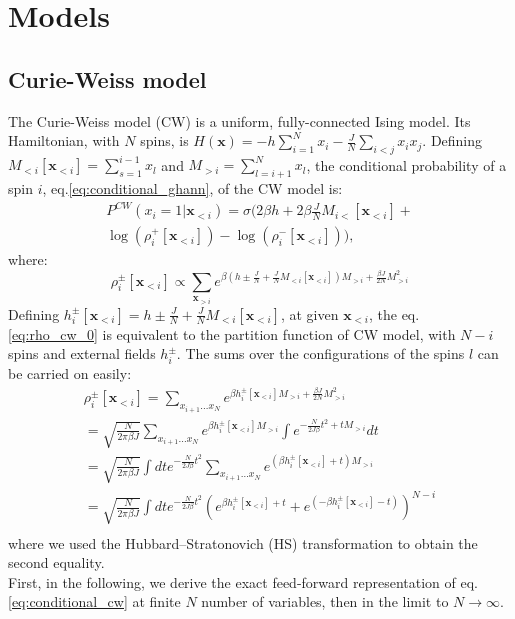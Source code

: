 \documentclass[aps,physrev,10pt,floatfix,longbibliography,nofootinbib,reprint]{revtex4-2}
\begin{document}
\section{Models}
\subsection{Curie-Weiss model}

The Curie-Weiss model (CW) is a uniform, fully-connected Ising model. Its Hamiltonian, with $N$ spins, is $H\left(\mathbf{x}\right)=-h\sum_{i=1}^{N}x_{i}-\frac{J}{N}\sum_{i<j}x_{i}x_{j}$. Defining $M_{<i}[\mathbf{x}_{<i}]=\sum_{s=1}^{i-1}x_{l}$ and $M_{>i}=\sum_{l=i+1}^{N}x_{l}$, the conditional probability of a spin $i$, eq.\ref{eq:conditional_ghann}, of the CW model is:
\begin{multline}
P^{CW}\left(x_{i}=1|\mathbf{x}_{<i}\right) = 
\sigma\bigg( 
 2 \beta h + 2 \beta \frac{J}{N}M_{i<}[\mathbf{x}_{<i}] + \\
 \log(\rho_i^+[\mathbf{x}_{<i}]) - \log(\rho_i^-[\mathbf{x}_{<i}])
\bigg),
\label{eq:conditional_cw}
\end{multline}
where:
\begin{equation}
\rho_i^{\pm}[\mathbf{x}_{<i}] \propto \sum_{\mathbf{x}_{>i}}e^{\beta \left(h\pm\frac{J}{N}+\frac{J}{N}M_{<i}[\mathbf{x}_{<i}]\right)M_{>i}+\frac{\beta J}{2N}M_{>i}^{2}} 
\label{eq:rho_cw_0}
\end{equation}
Defining $h_i^{\pm}[\mathbf{x}_{<i}] =h\pm\frac{J}{N}+\frac{J}{N}M_{<i}[\mathbf{x}_{<i}]$, at given $\mathbf{x}_{<i}$, the eq. \ref{eq:rho_cw_0} is equivalent to the partition function of CW model, with $N-i$ spins and external fields $h_i^{\pm}$. 
The sums over the configurations of the spins $l$ can be carried on easily:
\begin{multline}
 \rho_i^{\pm}[\mathbf{x}_{<i}] = \sum_{x_{i+1}\dots x_{N}} e^{\beta h_i^{\pm}[\mathbf{x}_{<i}]M_{>i} +\frac{\beta J}{2N}M_{>i}^{2}} \\
  = \sqrt{\frac{N}{2\pi \beta J}}\sum_{x_{i+1}\dots x_{N}}e^{\beta h_i^{\pm}[\mathbf{x}_{<i}] M_{>i}}\int e^{-\frac{N}{2J \beta}t^{2}+t M_{>i}} dt\\
  = \sqrt{\frac{N}{2\pi \beta J}}\int dt e^{-\frac{N}{2J \beta}t^{2}} \sum_{x_{i+1}\dots x_{N}}e^{(\beta h_i^{\pm}[\mathbf{x}_{<i}] + t) M_{>i}}  \\
 =  \sqrt{\frac{N}{2\pi \beta J}}\int dt e^{-\frac{N}{2J \beta}t^{2}} \left(e^{\beta h_i^{\pm}[\mathbf{x}_{<i}] + t} + e^{ (-\beta h_i^{\pm}[\mathbf{x}_{<i}] - t)} \right)^{N-i}  \\ 
 \label{eq:rho_last_exact}
 \end{multline} 
 where we used the Hubbard–Stratonovich (HS) transformation to obtain the second equality.\\
 First, in the following, we derive the exact feed-forward representation of eq.\ref{eq:conditional_cw} at finite $N$ number of variables, then in the limit to $N\rightarrow \infty$.\\
\end{document}
